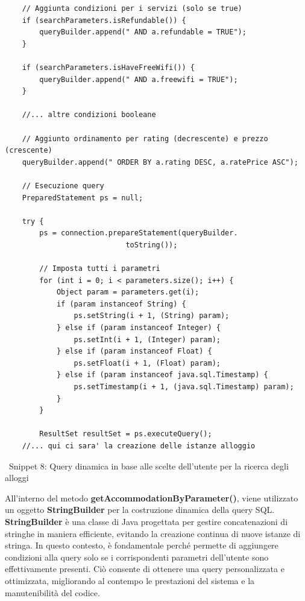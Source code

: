 \documentclass[10pt]{article}
\begin{document}
\begin{lstlisting}
    // Aggiunta condizioni per i servizi (solo se true)
    if (searchParameters.isRefundable()) {
        queryBuilder.append(" AND a.refundable = TRUE");
    }

    if (searchParameters.isHaveFreeWifi()) {
        queryBuilder.append(" AND a.freewifi = TRUE");
    }

    //... altre condizioni booleane

    // Aggiunto ordinamento per rating (decrescente) e prezzo (crescente)
    queryBuilder.append(" ORDER BY a.rating DESC, a.ratePrice ASC");

    // Esecuzione query
    PreparedStatement ps = null;

    try {
        ps = connection.prepareStatement(queryBuilder.
                            toString());

        // Imposta tutti i parametri
        for (int i = 0; i < parameters.size(); i++) {
            Object param = parameters.get(i);
            if (param instanceof String) {
                ps.setString(i + 1, (String) param);
            } else if (param instanceof Integer) {
                ps.setInt(i + 1, (Integer) param);
            } else if (param instanceof Float) {
                ps.setFloat(i + 1, (Float) param);
            } else if (param instanceof java.sql.Timestamp) {
                ps.setTimestamp(i + 1, (java.sql.Timestamp) param);
            }
        }

        ResultSet resultSet = ps.executeQuery();
    //... qui ci sara' la creazione delle istanze alloggio
\end{lstlisting}
\begin{center}
\par\
Snippet 8: Query dinamica in base alle scelte dell'utente per la ricerca degli alloggi
\par\medskip
\end{center}
All'interno del metodo \textbf{getAccommodationByParameter()}, viene utilizzato un oggetto \textbf{StringBuilder} per la costruzione dinamica della query SQL. \textbf{StringBuilder} \`e una classe di Java progettata per gestire concatenazioni di stringhe in maniera efficiente, evitando la creazione continua di nuove istanze di stringa. In questo contesto, \`e fondamentale perch\'e permette di aggiungere condizioni alla query solo se i corrispondenti parametri dell'utente sono effettivamente presenti. Ciò consente di ottenere una query personalizzata e ottimizzata, migliorando al contempo le prestazioni del sistema e la manutenibilità del codice.
\end{document}
